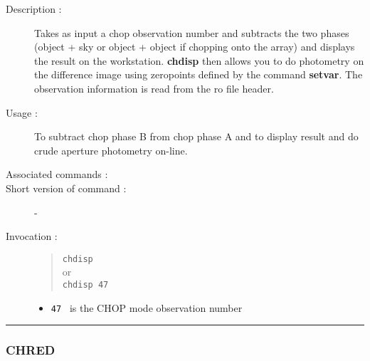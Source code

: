 \begin{description}

\item[Description :] Takes as input a chop observation number and
subtracts the two phases (object + sky or object + object if chopping
onto the array) and displays the result on the workstation.  {\bf
chdisp} then allows you to do photometry on the difference image using
zeropoints defined by the command {\bf setvar}.  The observation
information is read from the {\sc ro} file header.

\item[Usage :] To subtract chop phase B from chop phase A and to
display result and do crude aperture photometry on-line.
\item[Associated commands :] {\tt {}}
\item[Short version of command :] -
\item[Invocation :]

\begin{quote}{\tt  chdisp }\\
or \\
{\tt chdisp 47 }
\end{quote}

\begin{itemize}

\item {\tt 47 } is the CHOP mode observation number
\end{itemize}

\end{description}

\hrule
\subsubsection*{\label{CHRED}CHRED}

